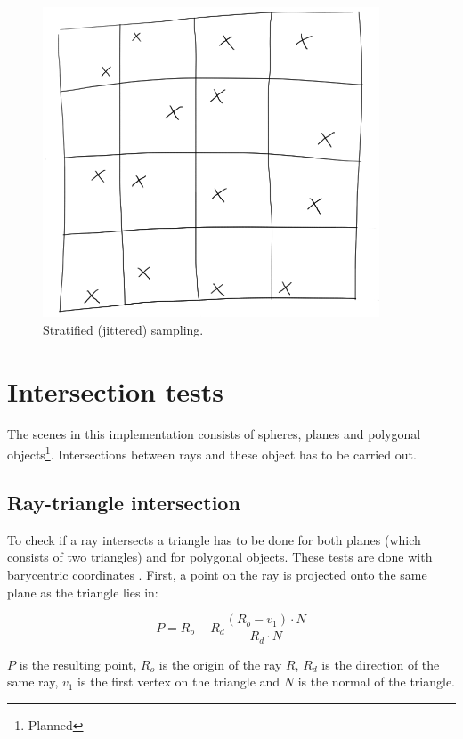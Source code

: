 \documentclass[a4paper]{report}
\begin{document}
\begin{figure}[h]
  \centering
  \includegraphics[width=10cm]{figures/1}
  \caption{Stratified (jittered) sampling.}
  \label{fig:jittered}
\end{figure}

\section{Intersection tests}

The scenes in this implementation consists of spheres, planes and
polygonal objects\footnote{Planned}. Intersections between rays and
these object has to be carried out.

\subsection{Ray-triangle intersection}

To check if a ray intersects a triangle has to be done for both planes
(which consists of two triangles) and for polygonal objects. These
tests are done with barycentric coordinates \cite{pointTest:10}. First, a point on the ray
is projected onto the same plane as the triangle lies in:

\begin{equation}
  P = R_o - R_d\frac{(R_o-v_1) \cdot N}{R_d \cdot N}
  \label{eq:planeproj}
\end{equation}

\(P\) is the resulting point, \(R_o\) is the origin of the ray
\(R\), \(R_d\) is the direction of the same ray, \(v_1\) is the first
vertex on the triangle and \(N\) is the normal of the triangle.
\end{document}
